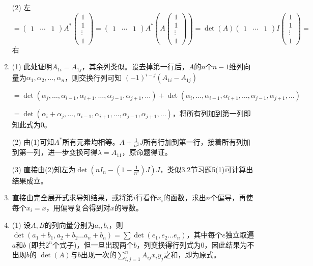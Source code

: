 \documentclass[a4paper,UTF8,fontset=windows]{ctexart}
\begin{document}
\begin{enumerate}
(2) 左$=\begin{pmatrix}1&\cdots&1\end{pmatrix}A^\ast\begin{pmatrix}1\\1\\\vdots\\1\end{pmatrix}=\begin{pmatrix}1&\cdots&1\end{pmatrix}A^\ast\left(A\begin{pmatrix}1\\1\\\vdots\\1\end{pmatrix}\right)=\det(A)\begin{pmatrix}1&\cdots&1\end{pmatrix}I\begin{pmatrix}1\\1\\\vdots\\1\end{pmatrix}=$右

\item
(1) 此处证明$A_{1i}=A_{1j}$，其余列类似。设去掉第一行后，$A$的$n$个$n-1$维列向量为$\alpha_1,\alpha_2,\dots,\alpha_n$，则交换行列可知
$(-1)^{i-j}(A_{1i}-A_{1j})$

$=\det(\alpha_j,\dots,\alpha_{i-1},\alpha_{i+1},\dots,\alpha_{j-1},\alpha_{j+1},\dots)+\det(\alpha_i,\dots,\alpha_{i-1},\alpha_{i+1},\dots,\alpha_{j-1},\alpha_{j+1},\dots)$

$=\det(\alpha_i+\alpha_j,\dots,\alpha_{i-1},\alpha_{i+1},\dots,\alpha_{j-1},\alpha_{j+1},\dots)$，将所有列加到第一列即知此式为0。

(2) 由(1)可知$A^\ast$所有元素均相等。$A+\frac{1}{n^2}J$所有行加到第一行，接着所有列加到第一列，进一步变换可得$\lambda=A_{11}$，原命题得证。

(3) 直接由(2)知左为$\det\left(nI_n-\left(1-\frac{1}{n^2}\right)J\right)J$，类似3.2节习题5(1)可计算出结果成立。

\item
直接由完全展开式求导知结果，或将第$i$行看作$x_i$的函数，求出$n$个偏导，再使每个$x_i=x$，用偏导复合得到对$x$的导数。

\item
(1) 设$A,B$的列向量分别为$a_i,b_i$，则$\det(a_1+b_1,a_2+b_2\dots a_n+b_n)=\sum\det(e_1,e_2\dots e_n)$，其中每个$e$独立取遍$a$和$b$ (即共$2^n$个式子)，但一旦出现两个$b$，列变换得行列式为0，因此结果为不出现$b$的 $\det(A)$与$b$出现一次的$\sum_{i,j=1}^{n}A_{ij}x_iy_j$之和，即为原式。


\end{enumerate}
\end{document}
